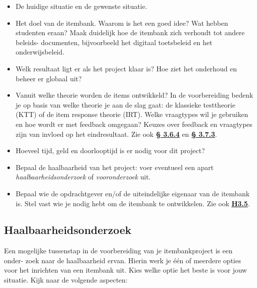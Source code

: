 \documentclass[
]{book}
\providecommand{\tightlist}{%
  \setlength{\itemsep}{0pt}\setlength{\parskip}{0pt}}
\begin{document}
\begin{itemize}
\tightlist
\item
  De huidige situatie en de gewenste situatie.
\item
  Het doel van de itembank. Waarom is het een goed idee? Wat hebben studenten eraan? Maak duidelijk hoe de itembank zich verhoudt tot andere beleids- documenten, bijvoorbeeld het digitaal toetsbeleid en het onderwijsbeleid.
\item
  Welk resultaat ligt er als het project klaar is? Hoe ziet het onderhoud en beheer er globaal uit?
\item
  Vanuit welke theorie worden de items ontwikkeld? In de voorbereiding bedenk je op basis van welke theorie je aan de slag gaat: de klassieke testtheorie (KTT) of de item response theorie (IRT). Welke vraagtypes wil je gebruiken en hoe wordt er met feedback omgegaan? Keuzes over feedback en vraagtypes zijn van invloed op het eindresultaat. Zie ook \textbf{\protect\hyperlink{feedback-en-vraagtypes}{§ 3.6.4}} en \textbf{\protect\hyperlink{toetsgegevens}{§ 3.7.3}}.
\item
  Hoeveel tijd, geld en doorlooptijd is er nodig voor dit project?
\item
  Bepaal de haalbaarheid van het project: voer eventueel een apart \emph{haalbaarheidsonderzoek} of \emph{vooronderzoek} uit.
\item
  Bepaal wie de opdrachtgever en/of de uiteindelijke eigenaar van de itembank is. Stel vast wie je nodig hebt om de itembank te ontwikkelen. Zie ook \textbf{\protect\hyperlink{componenten-en-processtappen}{H3.5}}.
\end{itemize}

\hypertarget{haalbaarheidsonderzoek}{%
\subsection{Haalbaarheidsonderzoek}\label{haalbaarheidsonderzoek}}

Een mogelijke tussenstap in de voorbereiding van je itembankproject is een onder- zoek naar de haalbaarheid ervan. Hierin werk je één of meerdere opties voor het inrichten van een itembank uit. Kies welke optie het beste is voor jouw situatie. Kijk naar de volgende aspecten:
\end{document}
